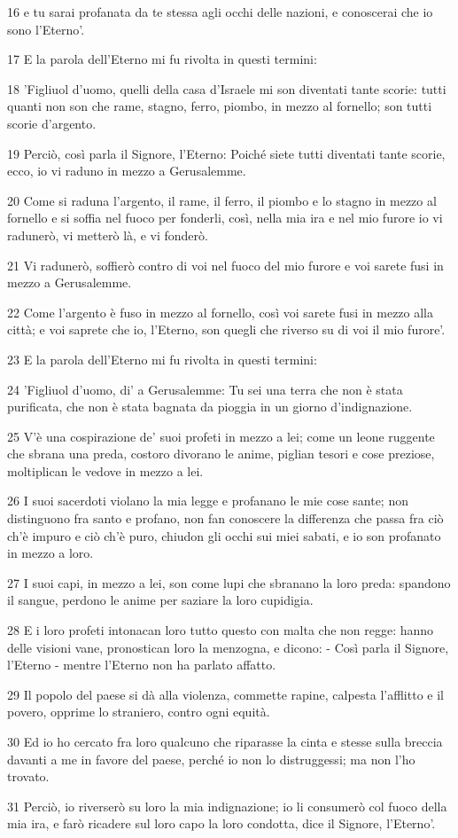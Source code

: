 \par 16 e tu sarai profanata da te stessa agli occhi delle nazioni, e conoscerai che io sono l'Eterno'.
\par 17 E la parola dell'Eterno mi fu rivolta in questi termini:
\par 18 'Figliuol d'uomo, quelli della casa d'Israele mi son diventati tante scorie: tutti quanti non son che rame, stagno, ferro, piombo, in mezzo al fornello; son tutti scorie d'argento.
\par 19 Perciò, così parla il Signore, l'Eterno: Poiché siete tutti diventati tante scorie, ecco, io vi raduno in mezzo a Gerusalemme.
\par 20 Come si raduna l'argento, il rame, il ferro, il piombo e lo stagno in mezzo al fornello e si soffia nel fuoco per fonderli, così, nella mia ira e nel mio furore io vi radunerò, vi metterò là, e vi fonderò.
\par 21 Vi radunerò, soffierò contro di voi nel fuoco del mio furore e voi sarete fusi in mezzo a Gerusalemme.
\par 22 Come l'argento è fuso in mezzo al fornello, così voi sarete fusi in mezzo alla città; e voi saprete che io, l'Eterno, son quegli che riverso su di voi il mio furore'.
\par 23 E la parola dell'Eterno mi fu rivolta in questi termini:
\par 24 'Figliuol d'uomo, di' a Gerusalemme: Tu sei una terra che non è stata purificata, che non è stata bagnata da pioggia in un giorno d'indignazione.
\par 25 V'è una cospirazione de' suoi profeti in mezzo a lei; come un leone ruggente che sbrana una preda, costoro divorano le anime, piglian tesori e cose preziose, moltiplican le vedove in mezzo a lei.
\par 26 I suoi sacerdoti violano la mia legge e profanano le mie cose sante; non distinguono fra santo e profano, non fan conoscere la differenza che passa fra ciò ch'è impuro e ciò ch'è puro, chiudon gli occhi sui miei sabati, e io son profanato in mezzo a loro.
\par 27 I suoi capi, in mezzo a lei, son come lupi che sbranano la loro preda: spandono il sangue, perdono le anime per saziare la loro cupidigia.
\par 28 E i loro profeti intonacan loro tutto questo con malta che non regge: hanno delle visioni vane, pronostican loro la menzogna, e dicono: - Così parla il Signore, l'Eterno - mentre l'Eterno non ha parlato affatto.
\par 29 Il popolo del paese si dà alla violenza, commette rapine, calpesta l'afflitto e il povero, opprime lo straniero, contro ogni equità.
\par 30 Ed io ho cercato fra loro qualcuno che riparasse la cinta e stesse sulla breccia davanti a me in favore del paese, perché io non lo distruggessi; ma non l'ho trovato.
\par 31 Perciò, io riverserò su loro la mia indignazione; io li consumerò col fuoco della mia ira, e farò ricadere sul loro capo la loro condotta, dice il Signore, l'Eterno'.

